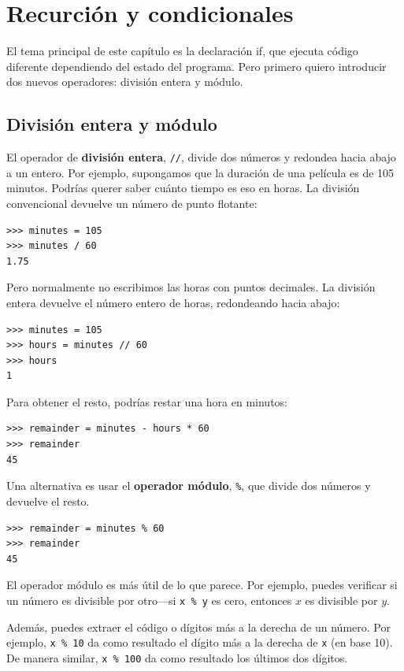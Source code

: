 
\chapter{Recurción y condicionales}

El tema principal de este capítulo es la declaración if, que ejecuta código diferente dependiendo del estado del programa. Pero primero quiero introducir dos nuevos operadores: división entera y módulo.

\section{División entera y módulo}

El operador de \textbf{división entera}, \texttt{//}, divide dos números y redondea hacia abajo a un entero. Por ejemplo, supongamos que la duración de una película es de 105 minutos. Podrías querer saber cuánto tiempo es eso en horas. La división convencional devuelve un número de punto flotante:

\begin{lstlisting}
>>> minutes = 105
>>> minutes / 60
1.75
\end{lstlisting}

Pero normalmente no escribimos las horas con puntos decimales. La división entera devuelve el número entero de horas, redondeando hacia abajo:

\begin{lstlisting}
>>> minutes = 105
>>> hours = minutes // 60
>>> hours
1
\end{lstlisting}

Para obtener el resto, podrías restar una hora en minutos:

\begin{lstlisting}
>>> remainder = minutes - hours * 60
>>> remainder
45
\end{lstlisting}

Una alternativa es usar el \textbf{operador módulo}, \texttt{\%}, que divide dos números y devuelve el resto.

\begin{lstlisting}
>>> remainder = minutes % 60
>>> remainder
45
\end{lstlisting}

El operador módulo es más útil de lo que parece. Por ejemplo, puedes verificar si un número es divisible por otro---si \texttt{x \% y} es cero, entonces $x$ es divisible por $y$.

Además, puedes extraer el código o dígitos más a la derecha de un número. Por ejemplo, \texttt{x \% 10} da como resultado el dígito más a la derecha de \texttt{x} (en base 10). De manera similar, \texttt{x \% 100} da como resultado los últimos dos dígitos.

